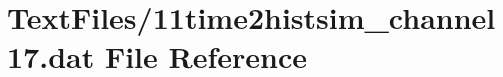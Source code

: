 \hypertarget{11time2histsim__channel17_8dat}{}\section{Text\+Files/11time2histsim\+\_\+channel17.dat File Reference}
\label{11time2histsim__channel17_8dat}
